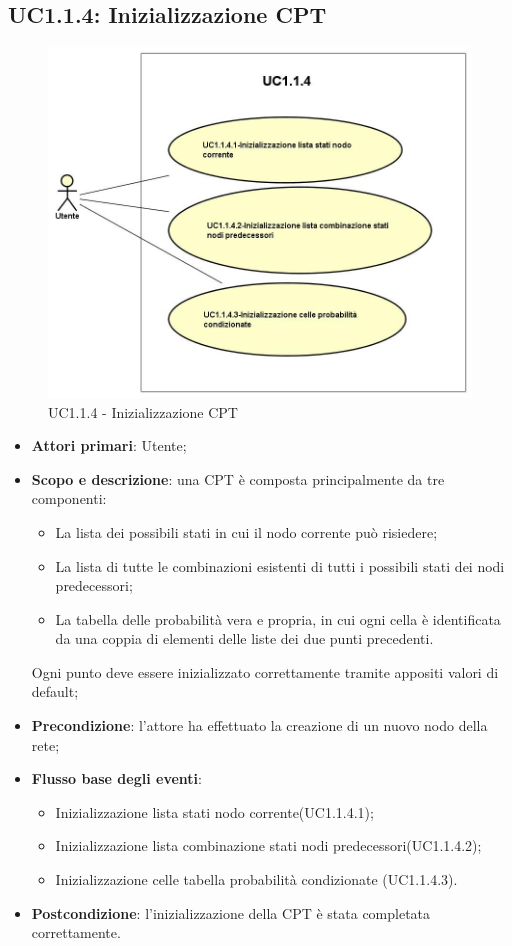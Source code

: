 \subsection{UC1.1.4: Inizializzazione CPT} 
\hypertarget{UC1.1.4}{} 
\begin{figure} [H]
	\centering
	\includegraphics[scale=0.45]{Img/UC1-1-4} 
	\caption{UC1.1.4 - Inizializzazione CPT} \label{} 
\end{figure} 
\begin{itemize} 
	\item{\textbf{Attori primari}: Utente;} 
	\item{\textbf{Scopo e descrizione}: una CPT è composta principalmente da tre componenti: 
		\begin{itemize} 
			\item{La lista dei possibili stati in cui il nodo corrente può risiedere;} 
			\item{La lista di tutte le combinazioni esistenti di tutti i possibili stati dei nodi predecessori;} 
			\item{La tabella delle probabilità vera e propria, in cui ogni cella è identificata da una coppia di elementi delle liste dei due punti precedenti.} 
		\end{itemize} 			
		Ogni punto deve essere inizializzato correttamente tramite appositi valori di default;
	} 
	\item{\textbf{Precondizione}: l'attore ha effettuato la creazione di un nuovo nodo della rete;} 
	\item{\textbf{Flusso base degli eventi}: } 
	\begin{itemize} 
		\item{Inizializzazione lista stati nodo corrente(UC1.1.4.1);} 
		\item{Inizializzazione lista combinazione stati nodi predecessori(UC1.1.4.2);} 
		\item{Inizializzazione celle tabella probabilità condizionate (UC1.1.4.3).} 
	\end{itemize} 
	\item{\textbf{Postcondizione}: l'inizializzazione della CPT è stata completata correttamente.} 
\end{itemize} 
